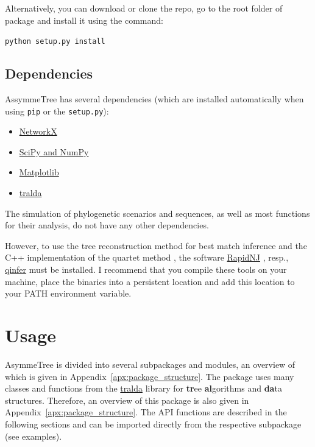\documentclass[hidelinks,11pt]{article}
\newcommand{\COMMANDLINE}[1]{\begingroup\par\vspace{3mm}\color{darkgrey}\begin{adjustwidth}{1cm}{1cm}\texttt{#1}\end{adjustwidth}\vspace{3mm}\endgroup}
\begin{document}
Alternatively, you can download or clone the repo, go to the root folder of package and install it using the command:

\COMMANDLINE{python setup.py install}


\subsection{Dependencies}

AssymmeTree has several dependencies (which are installed automatically when using \texttt{pip} or the \texttt{setup.py}):

\begin{itemize}
	\item \href{https://networkx.github.io}{NetworkX}
	\item \href{http://www.scipy.org/install.html}{SciPy and NumPy}
	\item \href{https://matplotlib.org/}{Matplotlib}
  \item \href{https://github.com/david-schaller/tralda}{tralda}
\end{itemize}

The simulation of phylogenetic scenarios and sequences, as well as most 
functions for their analysis, do not have any other dependencies.

However,
to use the tree reconstruction method for best match inference and the C++ 
implementation of the quartet method \citep{stadler2020}, the software 
\href{https://birc.au.dk/software/rapidnj/}{RapidNJ} \citep{simonsen2008}, 
resp., \href{https://github.com/david-schaller/qinfer}{qinfer} must be 
installed.
I recommend that you compile these tools on your machine, place the binaries 
into a persistent location and add this location to your PATH environment 
variable.



\section{Usage}

AsymmeTree is divided into several subpackages and modules, an overview of 
which is given in Appendix~\ref{apx:package_structure}.
The package uses many classes and functions from the 
\href{https://github.com/david-schaller/tralda}{tralda} library for 
\textbf{tr}ee \textbf{al}gorithms and \textbf{da}ta structures.
Therefore, an overview of this package is also given in 
Appendix~\ref{apx:package_structure}.
The API functions are described in the following sections and can be imported 
directly from the respective subpackage (see examples).
\end{document}
